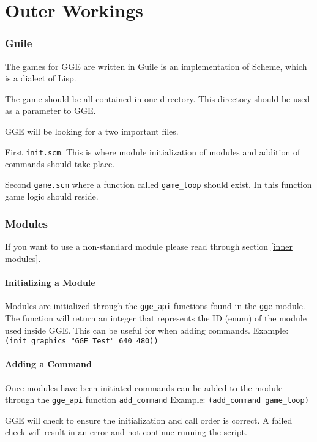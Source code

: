 \part{Outer Workings}

\section{Guile}
The games for GGE are written in Guile is an implementation of Scheme, which is a dialect of Lisp. 

The game should be all contained in one directory. This directory should be used as a parameter to GGE.

GGE will be looking for a two important files.

First \verb|init.scm|. This is where module initialization of modules and addition of commands should take place.

Second \verb|game.scm| where a function called \verb|game_loop| should exist. In this function game logic should reside.

\section{Modules}

If you want to use a non-standard module please read through section \ref{inner modules}.

\subsection{Initializing a Module}
Modules are initialized through the \verb|gge_api| functions found in the \verb|gge| module.
The function will return an integer that represents the ID (enum) of the module used inside GGE. This can be useful for when adding commands.
Example: \verb|(init_graphics "GGE Test" 640 480))|

\subsection{Adding a Command} \label{adding a command}
Once modules have been initiated commands can be added to the module through the \verb|gge_api| function \verb|add_command|
Example: \verb|(add_command game_loop)|

GGE will check to ensure the initialization and call order is correct. 
A failed check will result in an error and not continue running the script.
